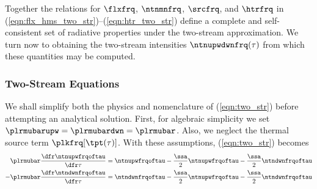 \documentclass[12pt]{article}
\begin{document}
Together the relations for $\flxfrq$, $\ntnmnfrq$, $\srcfrq$, and
$\htrfrq$ in (\ref{eqn:flx_hms_two_str})--(\ref{eqn:htr_two_str})
define a complete and self-consistent set of radiative properties 
under the two-stream approximation.
We turn now to obtaining the two-stream intensities $\ntnupwdwnfrq(\tau)$
from which these quantities may be computed.

\subsubsection[Two-Stream Equations]{Two-Stream Equations}\label{sxn:two_srm_eqn}
We shall simplify both the physics and nomenclature of
(\ref{eqn:two_str}) before attempting an analytical solution.
First, for algebraic simplicity we set
$\plrmubarupw = \plrmubardwn = \plrmubar$. 
Also, we neglect the thermal source term $\plkfrq[\tpt(\tau)]$.
With these assumptions, (\ref{eqn:two_str}) becomes
\begin{subequations}
\label{eqn:two_str_apx}
\begin{align}
\label{eqn:two_str_apx_upw}
\plrmubar \frac{\dfr\ntnupwfrqoftau}{\dfr\tau} & =  
\ntnupwfrqoftau - \frac{\ssa}{2} \ntnupwfrqoftau 
- \frac{\ssa}{2} \ntndwnfrqoftau \\
\label{eqn:two_str_apx_dwn}
-\plrmubar \frac{\dfr\ntndwnfrqoftau}{\dfr\tau} & =  
\ntndwnfrqoftau - \frac{\ssa}{2} \ntnupwfrqoftau 
- \frac{\ssa}{2} \ntndwnfrqoftau
\end{align}
\end{subequations} 
\end{document}
